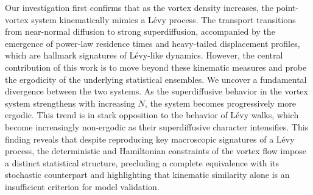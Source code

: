 \documentclass[]{article}
\begin{document}
Our investigation first confirms that as the vortex density increases, the point-vortex system kinematically mimics a Lévy process. The transport transitions from near-normal diffusion to strong superdiffusion, accompanied by the emergence of power-law residence times and heavy-tailed displacement profiles, which are hallmark signatures of Lévy-like dynamics. However, the central contribution of this work is to move beyond these kinematic measures and probe the ergodicity of the underlying statistical ensembles. We uncover a fundamental divergence between the two systems. As the superdiffusive behavior in the vortex system strengthens with increasing $N$, the system becomes progressively more ergodic. This trend is in stark opposition to the behavior of Lévy walks, which become increasingly non-ergodic as their superdiffusive character intensifies. This finding reveals that despite reproducing key macroscopic signatures of a Lévy process, the deterministic and Hamiltonian constraints of the vortex flow impose a distinct statistical structure, precluding a complete equivalence with its stochastic counterpart and highlighting that kinematic similarity alone is an insufficient criterion for model validation.
\end{document}
